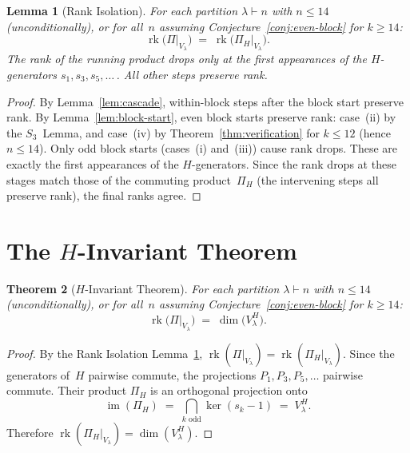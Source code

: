 \documentclass[12pt]{article}
\newtheorem{theorem}{Theorem}
\newtheorem{lemma}[theorem]{Lemma}
\theoremstyle{definition}
\theoremstyle{remark}
\begin{document}
\begin{lemma}[Rank Isolation]
\label{lem:rank-isolation}
For each partition $\lambda \vdash n$ with $n \le 14$
\textup{(}unconditionally\textup{)}, or for all~$n$ assuming
Conjecture~\ref{conj:even-block} for $k \ge 14$:
\[
  \operatorname{rk}\!\bigl(\Pi\big|_{V_\lambda}\bigr)
  \;=\;
  \operatorname{rk}\!\bigl(\Pi_H\big|_{V_\lambda}\bigr).
\]
The rank of the running product drops only at the first appearances of the
$H$-generators $s_1, s_3, s_5, \ldots$\,.  All other steps preserve rank.
\end{lemma}

\begin{proof}
By Lemma~\ref{lem:cascade}, within-block steps after the block start preserve rank.
By Lemma~\ref{lem:block-start}, even block starts preserve rank: case~(ii) by the
$S_3$~Lemma, and case~(iv) by Theorem~\ref{thm:verification} for $k \le 12$ (hence
$n \le 14$).  Only odd block starts (cases~(i) and~(iii)) cause rank drops.  These
are exactly the first appearances of the $H$-generators.  Since the rank drops at
these stages match those of the commuting product~$\Pi_H$ (the intervening steps
all preserve rank), the final ranks agree.
\end{proof}

\section{The $H$-Invariant Theorem}

\begin{theorem}[$H$-Invariant Theorem]
\label{thm:H-invariant}
For each partition $\lambda \vdash n$ with $n \le 14$
\textup{(}unconditionally\textup{)}, or for all~$n$ assuming
Conjecture~\ref{conj:even-block} for $k \ge 14$:
\[
  \operatorname{rk}\!\bigl(\Pi\big|_{V_\lambda}\bigr)
  \;=\;
  \dim\!\bigl(V_\lambda^H\bigr).
\]
\end{theorem}

\begin{proof}
By the Rank Isolation Lemma~\ref{lem:rank-isolation},
$\operatorname{rk}(\Pi|_{V_\lambda}) = \operatorname{rk}(\Pi_H|_{V_\lambda})$.
Since the generators of~$H$ pairwise commute, the projections $P_1, P_3, P_5, \ldots$
pairwise commute.  Their product $\Pi_H$ is an orthogonal projection onto
\[
  \operatorname{im}(\Pi_H)
  \;=\; \bigcap_{k \text{ odd}} \ker(s_k - 1)
  \;=\; V_\lambda^H.
\]
Therefore $\operatorname{rk}(\Pi_H|_{V_\lambda}) = \dim(V_\lambda^H)$.
\end{proof}
\end{document}
